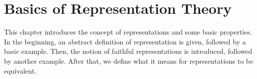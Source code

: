 \section{Basics of Representation Theory}

This chapter introduces the concept of representations and some basic properties.
In the beginning, an abstract definition of representation is given, followed by a basic example.
Then, the notion of faithful representations is introduced, followed by another example.
After that, we define what it means for representations to be equivalent.



